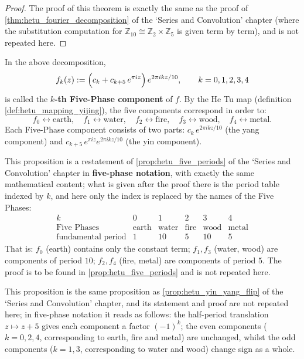 \begin{proof}
The proof of this theorem is exactly the same as the proof of \cref{thm:hetu_fourier_decomposition} of the `Series and Convolution' chapter (where the substitution computation for $\mathbb{Z}_{10} \cong \mathbb{Z}_2 \times \mathbb{Z}_5$ is given term by term), and is not repeated here.
\end{proof}

\begin{definition}\label{def:hetu_five_components_yijing}
In the above decomposition,
\[
f_k(z) := \Bigl( c_k + c_{k+5}\, e^{\pi i z} \Bigr)\, e^{2\pi i k z / 10}, \qquad k = 0, 1, 2, 3, 4
\]
is called the \textbf{$k$-th Five-Phase component} of $f$. By the He Tu map (definition \ref{def:hetu_mapping_yijing}), the five components correspond in order to:
\[
f_0 \leftrightarrow \text{earth},\quad f_1 \leftrightarrow \text{water},\quad f_2 \leftrightarrow \text{fire},\quad f_3 \leftrightarrow \text{wood},\quad f_4 \leftrightarrow \text{metal}.
\]
Each Five-Phase component consists of two parts: $c_k\, e^{2\pi i k z / 10}$ (the yang component) and $c_{k+5}\, e^{\pi i z} e^{2\pi i k z / 10}$ (the yin component).
\end{definition}

\begin{remark}\label{prop:hetu_five_periods_yijing}
This proposition is a restatement of \cref{prop:hetu_five_periods} of the `Series and Convolution' chapter in \textbf{five-phase notation}, with exactly the same mathematical content; what is given after the proof there is the period table indexed by $k$, and here only the index is replaced by the names of the Five Phases:
\[
\begin{array}{c|ccccc}
k & 0 & 1 & 2 & 3 & 4 \\
\hline
\text{Five Phases} & \text{earth} & \text{water} & \text{fire} & \text{wood} & \text{metal} \\
\text{fundamental period} & 1 & 10 & 5 & 10 & 5
\end{array}
\]
That is: $f_0$ (earth) contains only the constant term; $f_1, f_3$ (water, wood) are components of period $10$; $f_2, f_4$ (fire, metal) are components of period $5$. The proof is to be found in \cref{prop:hetu_five_periods} and is not repeated here.
\end{remark}

\begin{remark}\label{prop:hetu_yin_yang_flip_yijing}
This proposition is the same proposition as \cref{prop:hetu_yin_yang_flip} of the `Series and Convolution' chapter, and its statement and proof are not repeated here; in five-phase notation it reads as follows: the half-period translation $z \mapsto z + 5$ gives each component a factor $(-1)^k$; the even components ($k = 0, 2, 4$, corresponding to earth, fire and metal) are unchanged, whilst the odd components ($k = 1, 3$, corresponding to water and wood) change sign as a whole.
\end{remark}

